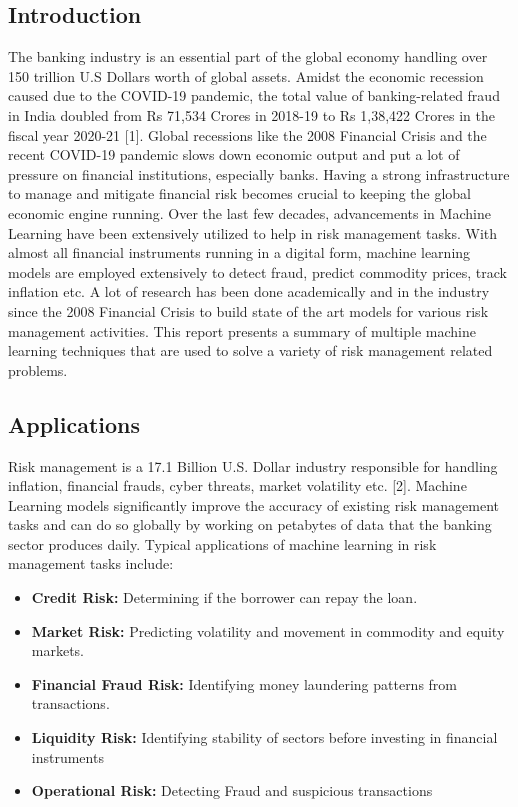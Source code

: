 \documentclass[a4paper, 12pt]{article}
\begin{document}
\begin{center}
\newpage
{}
\setcounter{page}{1}
\section{\centering Introduction}
\end{center}
\vskip 0.25in
The banking industry is an essential part of the global economy handling over 150 trillion U.S Dollars worth of global assets. Amidst the economic recession caused due to the COVID-19 pandemic, the total value of banking-related fraud in India doubled from Rs 71,534 Crores in 2018-19 to Rs 1,38,422 Crores in the fiscal year  2020-21 [1]. Global recessions like the 2008 Financial Crisis and the recent COVID-19 pandemic slows down economic output and put a lot of pressure on financial institutions, especially banks. Having a strong infrastructure to manage and mitigate financial risk becomes crucial to keeping the global economic engine running.
\vskip 0.2in
\noindent
Over the last few decades, advancements in Machine Learning have been extensively utilized to help in risk management tasks. With almost all financial instruments running in a digital form, machine learning models are employed extensively to detect fraud, predict commodity prices, track inflation etc. A lot of research has been done academically and in the industry since the 2008 Financial Crisis to build state of the art models for various risk management activities. This report presents a summary of multiple machine learning techniques that are used to solve a variety of risk management related problems.
\vskip 0.2in
\subsection{Applications}
Risk management is a 17.1 Billion U.S. Dollar industry responsible for handling inflation, financial frauds, cyber threats, market volatility etc. [2]. Machine Learning models significantly improve the accuracy of existing risk management tasks and can do so globally by working on petabytes of data that the banking sector produces daily. Typical applications of machine learning in risk management tasks include:

\begin{itemize}
  \item \textbf{Credit Risk:} Determining if the borrower can repay the loan.
  \item \textbf{Market Risk:} Predicting volatility and movement in commodity and equity markets.
  \item \textbf{Financial Fraud Risk:} Identifying money laundering patterns from transactions.
  \item \textbf{Liquidity Risk:} Identifying stability of sectors before investing in financial instruments
  \item \textbf{Operational Risk:} Detecting Fraud and suspicious transactions
\end{itemize}
\end{document}
